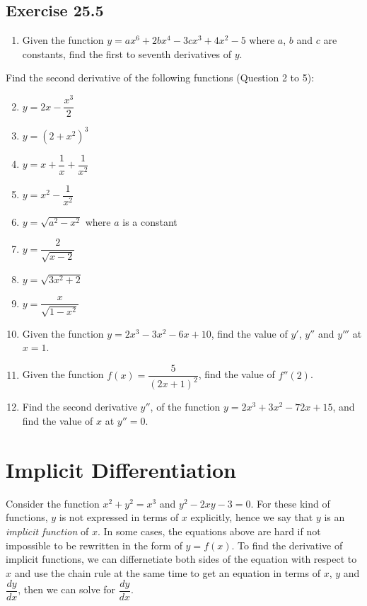 \documentclass[12pt]{report}
\begin{document}
\subsection*{Exercise 25.5}
\setlength{\columnseprule}{1pt}
\setlength{\columnsep}{24pt}
\begin{multicols}{2}
  \begin{enumerate}
    \item Given the function $y=a x^{6}+2b x^{4}-3c x^{3}+4x^{2}-5$ where $a$, $b$ and
          $c$ are constants, find the first to seventh derivatives of $y$.
  \end{enumerate}
  \noindent Find the second derivative of the following functions (Question 2 to 5):
  \begin{enumerate}
    \setcounter{enumi}{1}
    \item $y=2x-{\dfrac{x^{3}}{2}}$
    \item $y=\left(2+x^{2}\right)^{3}$
    \item $y=x+{\dfrac{1}{x}}+{\dfrac{1}{x^{2}}}$
    \item $y=x^{2}-{\dfrac{1}{x^{2}}}$
    \item $y={\sqrt{a^{2}-x^{2}}}$ where $a$ is a constant
    \item $y={\dfrac{2}{\sqrt{x-2}}}$
    \item $y={\sqrt{3x^{2}+2}}$
    \item $y={\dfrac{x}{\sqrt{1-x^{2}}}}$
    \item Given the function $y = 2x^3 - 3x^2 - 6x + 10$, find the value of $y'$, $y''$
          and $y'''$ at $x = 1$.
    \item Given the function $f(x) = \dfrac{5}{(2x + 1)^2}$, find the value of $f''(2)$.
    \item Find the second derivative $y''$, of the function $y = 2x^3 + 3x^2 - 72x + 15$,
          and find the value of $x$ at $y'' = 0$.
  \end{enumerate}
\end{multicols}

\section{Implicit Differentiation}

Consider the function $x^2 + y^2 = x^3$ and $y^2 - 2xy - 3 = 0$. For these kind
of functions, $y$ is not expressed in terms of $x$ explicitly, hence we say
that $y$ is an \textit{implicit function} of $x$. In some cases, the equations
above are hard if not impossible to be rewritten in the form of $y = f(x)$. To
find the derivative of implicit functions, we can differnetiate both sides of
the equation with respect to $x$ and use the chain rule at the same time to get
an equation in terms of $x$, $y$ and $\dfrac{dy}{dx}$, then we can solve for
$\dfrac{dy}{dx}$.
\end{document}
